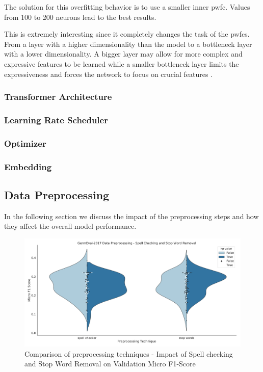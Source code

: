 The solution for this overfitting behavior is to use a smaller inner \gls{pwfc}. Values from 100 to 200 neurons lead to the best results.

This is extremely interesting since it completely changes the task of the \glspl{pwfc}. From a layer with a higher dimensionality than the model to a bottleneck layer with a lower dimensionality. A bigger layer may allow for more complex and expressive features to be learned while a smaller bottleneck layer limits the expressiveness and forces the network to focus on crucial features \cite{Ramsundar2015}.

\subsubsection{Transformer Architecture}

\subsubsection{Learning Rate Scheduler}

\subsubsection{Optimizer}

\subsubsection{Embedding}


\subsection{Data Preprocessing}
\label{subsec:06_dataPreprocessing}
In the following section we discuss the impact of the preprocessing steps and how they affect the overall model performance. 


\begin{figure}[ht]
	\centering
	\includegraphics[width=\textwidth]{figures/06_results/06_hp_ge_vio_data}
	\caption{Comparison of preprocessing techniques - Impact of Spell checking and Stop Word Removal on Validation Micro F1-Score}
	\label{fig:06_PreprocessingHp}
\end{figure}

